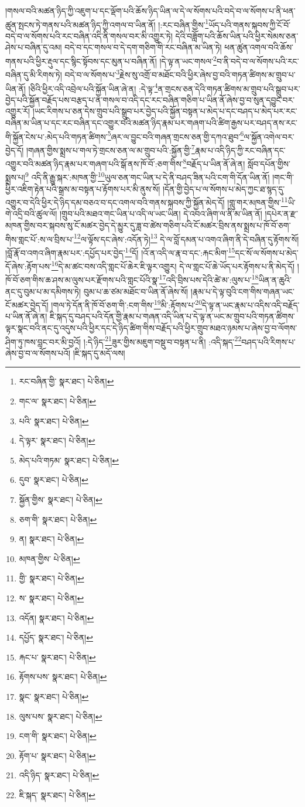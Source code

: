 །གསལ་བའི་མཚན་ཉིད་ཀྱི་འཇུག་པ་དང་ལྡོག་པའི་ཆོས་ཉིད་ཡིན་ལ་དེ་ལ་སོགས་པའི་བདེ་བ་ལ་སོགས་པ་ནི་ཕན་ཚུན་སྤངས་ཏེ་གནས་པའི་མཚན་ཉིད་ཀྱི་འགལ་བ་ཡིན་ནོ། །:རང་བཞིན་གྱིས་\footnote{རང་བཞིན་གྱི་  སྣར་ཐང་།  པེ་ཅིན། }ཡོད་པའི་གནས་སྐབས་ཀྱི་ངོ་བོ་བདེ་བ་ལ་སོགས་པའི་རང་བཞིན་འདི་ནི་གསལ་བར་མི་འགྱུར་ཏེ། དེའི་བཟློག་པའི་ཆོས་ཡིན་པའི་ཕྱིར་སེམས་ཅན་ཤེས་པ་བཞིན་དུ་འམ། བདེ་བ་དང་གསལ་བ་དེ་དག་གཅིག་གི་རང་བཞིན་མ་ཡིན་ཏེ། ཕན་ཚུན་འགལ་བའི་ཆོས་གནས་པའི་ཕྱིར་རྡུལ་དང་སྙིང་སྟོབས་དང་མུན་པ་བཞིན་ནོ། །དེ་ལྟ་ན་ཡང་གསལ་\footnote{གང་ལ་  སྣར་ཐང་།  པེ་ཅིན། }བ་ནི་བདེ་བ་ལ་སོགས་པའི་རང་བཞིན་དུ་མི་རིགས་ཏེ། བདེ་བ་ལ་སོགས་པ་\footnote{པའི་  སྣར་ཐང་།  པེ་ཅིན། }རྗེས་སུ་འགྲོ་བ་མཐོང་བའི་ཕྱིར་ཞེས་བྱ་བའི་གཏན་ཚིགས་མ་གྲུབ་པ་ཡིན་ནོ། །ཅིའི་ཕྱིར་འདི་འབྲེལ་པའི་སྐྱོན་ཡིན་ཞེ་ན། :དེ་ལྟ་\footnote{དེ་ལྟར་  སྣར་ཐང་།  པེ་ཅིན། }ན་གྲངས་ཅན་དེའི་གཏན་ཚིགས་མ་གྲུབ་པའི་སྒྲུབ་པར་བྱེད་པའི་སྐྱོན་བརྗོད་པས་བརྩད་པ་ན་གསལ་བ་འདི་དང་རང་བཞིན་གཅིག་པ་ཡིན་ནོ་ཞེས་བྱ་བ་སུན་དབྱུང་བར་འགྱུར་རོ། །ཡང་རིགས་པ་ཅན་དེས་གྲུབ་པའི་སྒྲུབ་པར་བྱེད་པའི་སྐྱོན་བསྟན་པ་མེད་པ་དང་བཤད་པ་མེད་པར་རང་བཞིན་མ་ཡིན་པ་དང་རང་བཞིན་དང་འགྱུར་བའི་མཚན་ཉིད་རྣམ་པར་གཞག་པའི་ཚིག་རྒྱས་པར་བཤད་ནས་རང་གི་སྐྱོན་ངེས་པ་:མེད་པའི་གཏན་ཚིགས་\footnote{མེད་པའི་གཏམ་  སྣར་ཐང་།  པེ་ཅིན། }ཞར་ལ་བྱུང་བའི་གཞན་གྲངས་ཅན་གྱི་དཀའ་ཐུབ་\footnote{དུབ་  སྣར་ཐང་།  པེ་ཅིན། }ལ་སྐྱོན་འགེལ་བར་བྱེད་དོ། །གཞན་གྱིས་སྨྲས་པ་གལ་ཏེ་གྲངས་ཅན་ལ་མ་གྲུབ་པའི་:སྐྱོན་གྱི་\footnote{སྐྱོན་གྱིས་  སྣར་ཐང་།  པེ་ཅིན། }རྣམ་པ་འདི་ཉིད་ཀྱི་རང་བཞིན་དང་འགྱུར་བའི་མཚན་ཉིད་རྣམ་པར་གཞག་པའི་སྒོ་ནས་ཁོ་བོ་:ཅག་གིས་\footnote{ཅག་གི་  སྣར་ཐང་།  པེ་ཅིན། }བརྗོད་པ་ཡིན་ནོ་ཞེ་ན། སློབ་དཔོན་གྱིས་སྨྲས་པ།\footnote{ན།  སྣར་ཐང་།  པེ་ཅིན། } འདི་ནི་རྒྱུ་སྐར་:མཁན་གྱི་\footnote{མཁན་གྱིས་  པེ་ཅིན། }ཡུལ་ཅན་གང་ཡིན་པ་དེ་ནི་བཤད་ཟིན་པའི་ངག་གི་དོན་ཡིན་ནོ། །གང་གི་ཕྱིར་འཇིག་རྟེན་པའི་སྒྲས་མ་བསྟན་པ་རྟོགས་པར་མི་ནུས་སོ། །དོན་གྱི་བྱེད་པ་ལ་སོགས་པ་མེད་ཀྱང་ཐ་སྙད་དུ་འགྱུར་བ་དེའི་ཕྱིར་དེ་ཉིད་དམ་བཅའ་བ་དང་འགལ་བའི་གནས་སྐབས་ཀྱི་སྐྱོན་མེད་དོ། །གླུ་གར་མཁན་གྱིས་\footnote{གྱི་  སྣར་ཐང་།  པེ་ཅིན། }ཡི་གེ་འདྲི་བའི་ཚུལ་ལོ། །གྲུབ་པའི་མཐའ་གང་ཡིན་པ་འདི་ལ་ཡང་ཡིན། དེ་འབའ་ཞིག་ལ་ནི་མ་ཡིན་ནོ། །དཔེར་ན་རྫ་མཁན་གྱིས་བར་སྐབས་སུ་ངོ་མཚར་བྱེད་དེ་མྱུར་དུ་ཟླ་བ་ཚེས་གཅིག་པའི་ངོ་མཚར་བྲིས་ནས་སྨྲས་པ་ཁོ་བོ་ཅག་གིས་གླང་པོ་:ས་ལ་བྲིས་པ་\footnote{ས་  སྣར་ཐང་།  པེ་ཅིན། }ལ་ལྟོས་དང་ཞེས་:འདོན་ཏེ།\footnote{འདོན།  སྣར་ཐང་།  པེ་ཅིན། } དེ་ལ་བློ་དམན་པ་འགའ་ཞིག་ནི་དེ་བཞིན་དུ་རྟོགས་སོ། །བློ་རྣོ་བ་འགའ་ཞིག་རྣམ་པར་:དཔྱོད་པར་བྱེད་\footnote{དཔྱོད་  སྣར་ཐང་།  པེ་ཅིན། }དོ། །འོ་ན་འདི་ལ་རྣ་བ་དང་:རྐང་མིག་\footnote{རྐང་པ་  སྣར་ཐང་།  པེ་ཅིན། }དང་སོ་ལ་སོགས་པ་མེད་དོ་ཞེས་:རྟོག་པས་\footnote{རྟོགས་པས་  སྣར་ཐང་།  པེ་ཅིན། }དེ་མ་ཚང་བས་འདི་གླང་པོ་ཆེར་ཇི་ལྟར་འགྱུར། དེ་ལ་གླང་པོ་ཆེ་ཡོད་པར་རྟོགས་པ་ནི་མེད་དོ། །ཁོ་བོ་ཅག་གིས་ཆ་ཤས་མ་ལུས་པར་རྫོགས་པའི་གླང་པོའི་སྣ་\footnote{སྣང་  སྣར་ཐང་།  པེ་ཅིན། }འདི་བྲིས་པས་དེའི་ཚེ་མ་:ལུས་པ་\footnote{ལུས་པས་  སྣར་ཐང་།  པེ་ཅིན། }ཡིན་ན་ཆུའི་ནང་དུ་བུམ་པ་མ་དམིགས་ཏེ། བུམ་པ་ཆ་ཙམ་མཐོང་བ་ཡིན་ནོ་ཞེས་སོ། །རྣམ་པ་དེ་ལྟ་བུའི་ངག་གིས་གཞན་ཡང་ངོ་མཚར་བྱེད་དོ། །གལ་ཏེ་དོན་ནི་ཁོ་བོ་ཅག་གི་:ངག་གིས་\footnote{ངག་གི་  སྣར་ཐང་།  པེ་ཅིན། }མི་:རྟོགས་པ་\footnote{རྟོག་པ་  སྣར་ཐང་།  པེ་ཅིན། }དེ་ལྟ་ན་ཡང་རྣམ་པ་འདིས་འདི་བརྗོད་པ་ཡིན་ནོ་ཞེ་ན། ཇི་སྐད་དུ་བཤད་པའི་དོན་གྱི་རྣམ་པ་གཞན་འདི་ཡིན་པ་དེ་ལྟ་ན་ཡང་མ་གྲུབ་པའི་གཏན་ཚིགས་ལྟར་སྣང་བའི་ནང་དུ་འདུས་པའི་ཕྱིར་དང་དེ་ཉིད་ཚིག་གིས་བརྗོད་པའི་ཕྱིར་གྲུབ་མཐའ་ཉམས་པ་ཞེས་བྱ་བ་ལོགས་ཤིག་ཏུ་ཁས་བླང་བར་མི་བྱའོ། །:དེ་ཉིད་\footnote{འདི་ཉིད་  སྣར་ཐང་།  པེ་ཅིན། }ཟུར་གྱིས་མཇུག་བསྡུ་བ་བསྟན་པ་ནི། :འདི་སྐད་\footnote{ཇི་སྐད་  སྣར་ཐང་།  པེ་ཅིན། }བཤད་པའི་རིགས་པ་ཞེས་བྱ་བ་ལ་སོགས་པའོ། །ཇི་སྐད་དུ་མདོ་ལས། 
